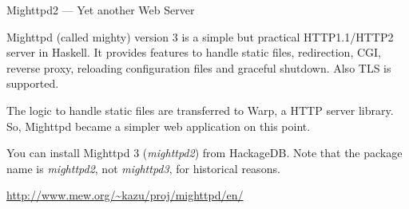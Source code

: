 \begin{hcarentry}[updated]{Mighttpd2 --- Yet another Web Server}
\label{mighttpd2}
\makeheader

Mighttpd (called mighty) version 3 is a simple but practical HTTP1.1/HTTP2 server in Haskell.
It provides features to handle static files, redirection, CGI, reverse proxy, reloading
configuration files and graceful shutdown. Also TLS is supported.

The logic to handle static files are transferred to Warp, a HTTP server library. So, Mighttpd became a simpler web application on this point.

You can install Mighttpd 3 ({\it mighttpd2}) from HackageDB. Note that the package name
is {\it mighttpd2}, not {\it mighttpd3}, for historical reasons.

\FurtherReading
\begin{compactitem}
\item \url{http://www.mew.org/~kazu/proj/mighttpd/en/}
\end{compactitem}
\end{hcarentry}
